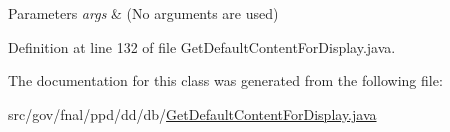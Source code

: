 \begin{DoxyParams}{Parameters}
{\em args} & (No arguments are used) \\
\hline
\end{DoxyParams}


Definition at line 132 of file Get\-Default\-Content\-For\-Display.\-java.



The documentation for this class was generated from the following file\-:\begin{DoxyCompactItemize}
\item 
src/gov/fnal/ppd/dd/db/\hyperlink{GetDefaultContentForDisplay_8java}{Get\-Default\-Content\-For\-Display.\-java}\end{DoxyCompactItemize}
